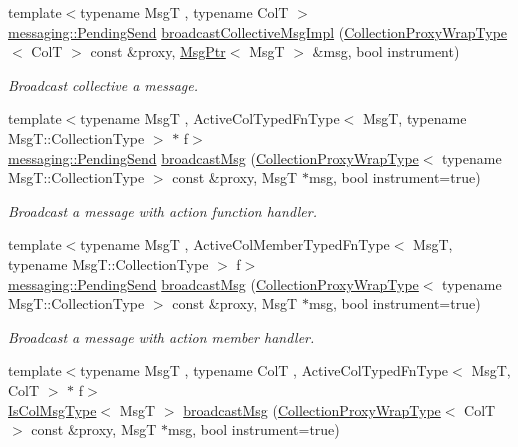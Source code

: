 \begin{DoxyCompactItemize}
{\footnotesize template$<$typename MsgT , typename ColT $>$ }\\\hyperlink{structvt_1_1messaging_1_1_pending_send}{messaging\+::\+Pending\+Send} \hyperlink{structvt_1_1vrt_1_1collection_1_1_collection_manager_aae2f8d1ebc378183074c3572894c7ffc}{broadcast\+Collective\+Msg\+Impl} (\hyperlink{structvt_1_1vrt_1_1collection_1_1_collection_manager_a56458ed7f9bb22b631b9b3a745f42f94}{Collection\+Proxy\+Wrap\+Type}$<$ ColT $>$ const \&proxy, \hyperlink{namespacevt_a9f5ebd62ee9d6dd8829e3e1cc4f858e9}{Msg\+Ptr}$<$ MsgT $>$ \&msg, bool instrument)
\begin{DoxyCompactList}\small\item\em Broadcast collective a message. \end{DoxyCompactList}\item 
{\footnotesize template$<$typename MsgT , Active\+Col\+Typed\+Fn\+Type$<$ Msg\+T, typename Msg\+T\+::\+Collection\+Type $>$ $\ast$ f$>$ }\\\hyperlink{structvt_1_1messaging_1_1_pending_send}{messaging\+::\+Pending\+Send} \hyperlink{structvt_1_1vrt_1_1collection_1_1_collection_manager_a9cadcebd1d7c26512091f9624a23a02c}{broadcast\+Msg} (\hyperlink{structvt_1_1vrt_1_1collection_1_1_collection_manager_a56458ed7f9bb22b631b9b3a745f42f94}{Collection\+Proxy\+Wrap\+Type}$<$ typename Msg\+T\+::\+Collection\+Type $>$ const \&proxy, MsgT $\ast$msg, bool instrument=true)
\begin{DoxyCompactList}\small\item\em Broadcast a message with action function handler. \end{DoxyCompactList}\item 
{\footnotesize template$<$typename MsgT , Active\+Col\+Member\+Typed\+Fn\+Type$<$ Msg\+T, typename Msg\+T\+::\+Collection\+Type $>$ f$>$ }\\\hyperlink{structvt_1_1messaging_1_1_pending_send}{messaging\+::\+Pending\+Send} \hyperlink{structvt_1_1vrt_1_1collection_1_1_collection_manager_a9cadcebd1d7c26512091f9624a23a02c}{broadcast\+Msg} (\hyperlink{structvt_1_1vrt_1_1collection_1_1_collection_manager_a56458ed7f9bb22b631b9b3a745f42f94}{Collection\+Proxy\+Wrap\+Type}$<$ typename Msg\+T\+::\+Collection\+Type $>$ const \&proxy, MsgT $\ast$msg, bool instrument=true)
\begin{DoxyCompactList}\small\item\em Broadcast a message with action member handler. \end{DoxyCompactList}\item 
{\footnotesize template$<$typename MsgT , typename ColT , Active\+Col\+Typed\+Fn\+Type$<$ Msg\+T, Col\+T $>$ $\ast$ f$>$ }\\\hyperlink{structvt_1_1vrt_1_1collection_1_1_collection_manager_a21c21612c806016788057aeab142af20}{Is\+Col\+Msg\+Type}$<$ MsgT $>$ \hyperlink{structvt_1_1vrt_1_1collection_1_1_collection_manager_a2ea2ea93c25a438f0b9b6af390ef0881}{broadcast\+Msg} (\hyperlink{structvt_1_1vrt_1_1collection_1_1_collection_manager_a56458ed7f9bb22b631b9b3a745f42f94}{Collection\+Proxy\+Wrap\+Type}$<$ ColT $>$ const \&proxy, MsgT $\ast$msg, bool instrument=true)

\end{DoxyCompactItemize}
